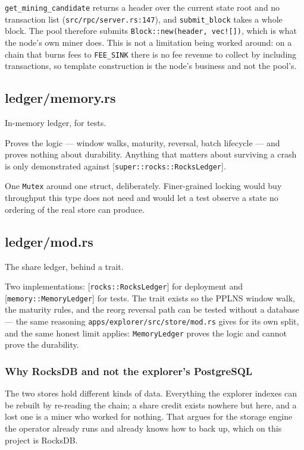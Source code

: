 \documentclass[11pt,a4paper]{article}
\begin{document}
\texttt{get\_mining\_candidate} returns a header over the current state root and no
transaction list (\texttt{src/rpc/server.rs:147}), and \texttt{submit\_block} takes a whole
block. The pool therefore submits \texttt{Block::new(header, vec![])}, which is what
the node's own miner does. This is not a limitation being worked around: on
a chain that burns fees to \texttt{FEE\_SINK} there is no fee revenue to collect by
including transactions, so template construction is the node's business and
not the pool's.

\subsection{ledger/memory.rs}
In-memory ledger, for tests.

Proves the logic — window walks, maturity, reversal, batch lifecycle — and
proves nothing about durability. Anything that matters about surviving a
crash is only demonstrated against [\texttt{super::rocks::RocksLedger}].

One \texttt{Mutex} around one struct, deliberately. Finer-grained locking would buy
throughput this type does not need and would let a test observe a state no
ordering of the real store can produce.

\subsection{ledger/mod.rs}
The share ledger, behind a trait.

Two implementations: [\texttt{rocks::RocksLedger}] for deployment and
[\texttt{memory::MemoryLedger}] for tests. The trait exists so the PPLNS window
walk, the maturity rules, and the reorg reversal path can be tested without
a database — the same reasoning \texttt{apps/explorer/src/store/mod.rs} gives for its
own split, and the same honest limit applies: \texttt{MemoryLedger} proves the
logic and cannot prove the durability.

\subsubsection{Why RocksDB and not the explorer's PostgreSQL}

The two stores hold different kinds of data. Everything the explorer indexes
can be rebuilt by re-reading the chain; a share credit exists nowhere but
here, and a lost one is a miner who worked for nothing. That argues for the
storage engine the operator already runs and already knows how to back up,
which on this project is RocksDB.
\end{document}
